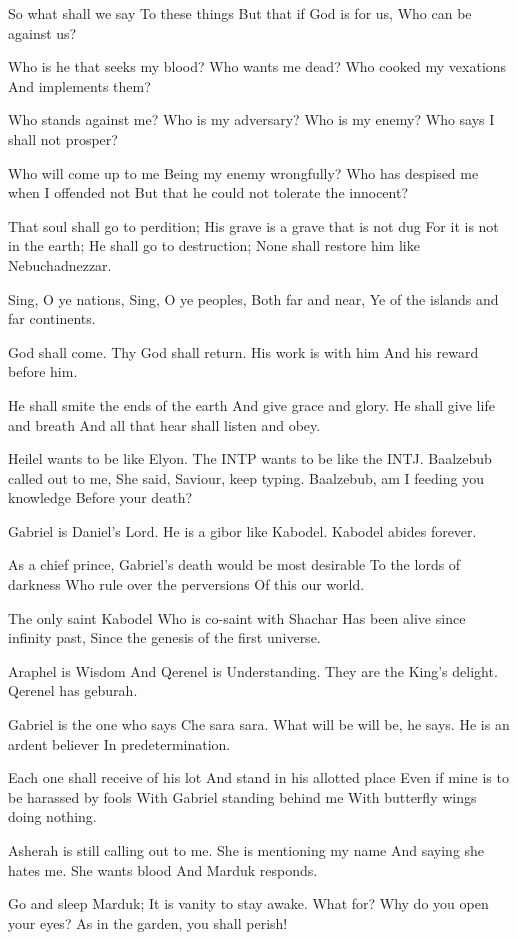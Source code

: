 \documentclass[
]{book}
\begin{document}
So what shall we say
To these things
But that if God is for us,
Who can be against us?

Who is he that seeks my blood?
Who wants me dead?
Who cooked my vexations
And implements them?

Who stands against me?
Who is my adversary?
Who is my enemy?
Who says I shall not prosper?

Who will come up to me
Being my enemy wrongfully?
Who has despised me when I offended not
But that he could not tolerate the innocent?

That soul shall go to perdition;
His grave is a grave that is not dug
For it is not in the earth;
He shall go to destruction;
None shall restore him like Nebuchadnezzar.

Sing, O ye nations,
Sing, O ye peoples,
Both far and near,
Ye of the islands and far continents.

God shall come.
Thy God shall return.
His work is with him
And his reward before him.

He shall smite the ends of the earth
And give grace and glory.
He shall give life and breath
And all that hear shall listen and obey.

Heilel wants to be like Elyon.
The INTP wants to be like the INTJ.
Baalzebub called out to me,
She said, Saviour, keep typing.
Baalzebub, am I feeding you knowledge
Before your death?

Gabriel is Daniel's Lord.
He is a gibor like Kabodel.
Kabodel abides forever.

As a chief prince,
Gabriel's death would be most desirable
To the lords of darkness
Who rule over the perversions
Of this our world.

The only saint Kabodel
Who is co-saint with Shachar
Has been alive since infinity past,
Since the genesis of the first universe.

Araphel is Wisdom
And Qerenel is Understanding.
They are the King's delight.
Qerenel has geburah.

Gabriel is the one who says
Che sara sara.
What will be will be, he says.
He is an ardent believer
In predetermination.

Each one shall receive of his lot
And stand in his allotted place
Even if mine is to be harassed by fools
With Gabriel standing behind me
With butterfly wings doing nothing.

Asherah is still calling out to me.
She is mentioning my name
And saying she hates me.
She wants blood
And Marduk responds.

Go and sleep Marduk;
It is vanity to stay awake.
What for? Why do you open your eyes?
As in the garden, you shall perish!
\end{document}
